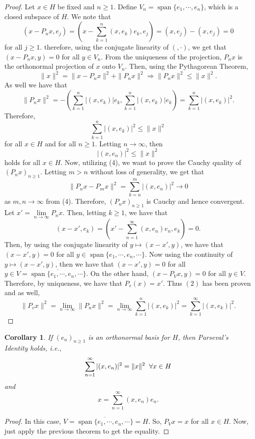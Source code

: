 \documentclass[12pt]{article}
\newtheorem{corollary}{Corollary}
\newcommand{\sumi}{\sum\limits_{n = 1}^{\infty}}
\newcommand{\sumk}{\sum\limits_{k = 1}^{\infty}}
\newcommand{\sumkn}{\sum\limits_{k = 1}^{n}}
\newcommand{\ov}{\overline}
\newcommand{\limi}{\lim\limits_{n \to \infty}}
\DeclareMathOperator*{\spa}{span}
\begin{document}
\vspace{-20pt}
\begin{proof}
Let $x \in H$ be fixed and $n \geq 1$. Define $V_n = \spa\{ e_1, \cdots, e_n \}$, which is a closed subspace of $H$. We note that 
\[ (x - P_nx, e_j) = \left( x - \sumkn (x, e_k) e_k, e_j \right) = (x, e_j) - (x, e_j) = 0\]
for all $j \geq 1$. therefore, using the conjugate linearity of $(, \cdot)$, we get that $(x - P_nx, y) = 0$ for all $y \in V_n$. From the uniqueness of the projection, $P_nx$ is the orthonormal projection of $x$ onto $V_n$. Then, using the Pythagorean Theorem,
\[ \| x \|^2 = \| x - P_nx \|^2 + \| P_n x \|^2 \Longrightarrow \| P_n x \|^2 \leq \| x \|^2.\]
As well we have that 
\[ \| P_n x \|^2 =- \left( \sumkn |(x, e_k)| e_k, \sumkn |(x, e_k)| e_k \right) = \sumkn |(x, e_k)|^2.\]
Therefore, 
\[ \sumkn |(x, e_k)|^2 \leq \| x \|^2  \]
for all $x \in H$ and for all $n \geq 1$. Letting $n \to \infty$, then 
\begin{equation}
|(x, e_n)|^2 \leq \| x \|^2 
\end{equation} 
holds for all $x \in H$. Now, utilizing (4), we want to prove the Cauchy quality of $(P_nx)_{n \geq 1}$. Letting $m > n$ without loss of generality, we get that 
\[ \| P_n x - P_m x \|^2 = \sum\limits_{k = n}^m |(x, e_n)|^2 \to 0\]
as $m, n \to \infty$ from (4). Therefore, $(P_nx)_{n \geq 1}$ is Cauchy and hence convergent. Let $x' = \limi P_nx$. Then, letting $k \geq 1$, we have that 
\[(x - x', e_k) = \left( x' - \sumi (x, e_n) e_n, e_k \right) = 0. \]
Then, by using the conjugate linearity of $y \mapsto (x - x', y)$, we have that $(x -x', y) = 0$ for all $y \in \spa\{ e_1, \cdots, e_n, \cdots \}$. Now using the continuity of $y \mapsto (x - x', y)$, then we have that $(x -x', y) = 0$ for all $y \in V = \ov{\spa\{ e_1, \cdots, e_n, \cdots \}}$. On the other hand, $(x - P_Vx, y) = 0$ for all $y \in V$. Therefore, by uniqueness, we have that $P_v(x) = x'$. Thus $(2)$ has been proven and as well, 
\[ \| P_v x \|^2 = \limi \| P_n x \|^2 = \limi \sumkn |(x, e_k)|^2 = \sumk |(x, e_k)|^2.\]
\end{proof}
\begin{corollary}
If $(e_n)_{n \geq 1}$ is an orthonormal basis for $H$, then Parseval's Identity holds, i.e.,
\[ \sumi |(x, e_n)|^2 = \| x \|^2 \hspace{2mm} \forall x \in H\]
and 
\[ x = \sumi (x, e_n) e_n.\]
\end{corollary}
\vspace{-20pt}
\begin{proof}
In this case, $V = \ov{\spa\{ e_1, \cdots, e_n, \cdots \} } = H$. So, $P_Vx = x$ for all $x \in H$. Now, just apply the previous theorem to get the equality. 
\end{proof}
\end{document}
